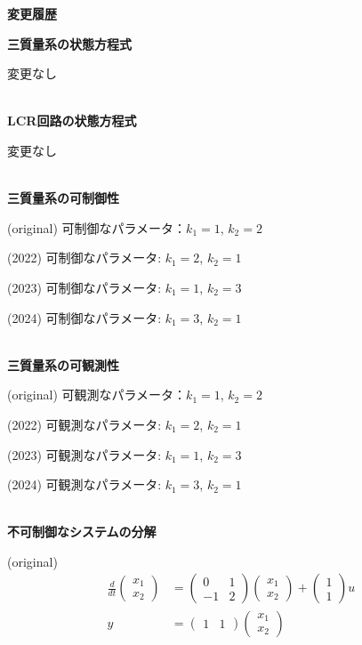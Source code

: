 



\begin{center}
	{\Large \bf 変更履歴}
\end{center}
	

\noindent
{\bf 三質量系の状態方程式}

変更なし

\ \\ \noindent
{\bf LCR回路の状態方程式}

変更なし

\ \\ \noindent
{\bf 三質量系の可制御性}

(original) 可制御なパラメータ：$k_1=1$, $k_2=2$

(2022) 可制御なパラメータ:{\color{red} $k_1=2$, $k_2=1$}

(2023) 可制御なパラメータ:{\color{red} $k_1=1$, $k_2=3$}

(2024) 可制御なパラメータ:{\color{red} $k_1=3$, $k_2=1$}

\ \\ \noindent
{\bf 三質量系の可観測性}

(original) 可観測なパラメータ：$k_1=1$, $k_2=2$

(2022) 可観測なパラメータ:{\color{red} $k_1=2$, $k_2=1$}

(2023) 可観測なパラメータ:{\color{red} $k_1=1$, $k_2=3$}

(2024) 可観測なパラメータ:{\color{red} $k_1=3$, $k_2=1$}

\ \\ \noindent
{\bf 不可制御なシステムの分解}

(original)
\begin{align*}
	\frac{d}{dt}
	\left (
	\begin{array}{c}
	 x_1 \\ x_2 
	\end{array}
	\right )
	& = 
	\left (
	\begin{array}{cc}
	 0 & 1 \\
	 -1 & 2
	\end{array}
	\right )
	\left (
	\begin{array}{c}
	 x_1 \\ x_2 
	\end{array}
	\right )
	+
	\left (
	\begin{array}{c}
	 1 \\ 1 
	\end{array}
	\right )
	u
\\
	y 
	&=
	\left (
	\begin{array}{cc}
	 1 & 1  
	\end{array}
	\right )
	\left (
	\begin{array}{c}
	 x_1 \\ x_2 
	\end{array}
	\right )
\end{align*}

